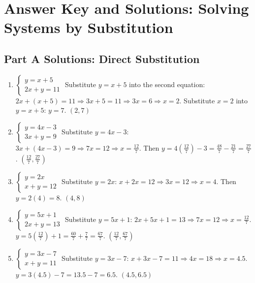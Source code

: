 \documentclass[14pt]{extarticle}
\begin{document}
\newpage


\section*{Answer Key and Solutions: Solving Systems by Substitution}

\subsection*{Part A Solutions: Direct Substitution}
\begin{enumerate}
    \item \(\begin{cases} y = x + 5 \\ 2x + y = 11 \end{cases}\)  
    Substitute \(y = x + 5\) into the second equation:  
    \(2x + (x + 5) = 11 \Rightarrow 3x + 5 = 11 \Rightarrow 3x = 6 \Rightarrow x = 2\).  
    Substitute \(x = 2\) into \(y = x + 5\): \(y = 7\).  
    \(\boxed{(2, 7)}\)

    \item \(\begin{cases} y = 4x - 3 \\ 3x + y = 9 \end{cases}\)  
    Substitute \(y = 4x - 3\): \(3x + (4x - 3) = 9 \Rightarrow 7x = 12 \Rightarrow x = \tfrac{12}{7}\).  
    Then \(y = 4(\tfrac{12}{7}) - 3 = \tfrac{48}{7} - \tfrac{21}{7} = \tfrac{27}{7}\).  
    \(\boxed{(\tfrac{12}{7}, \tfrac{27}{7})}\)

    \item \(\begin{cases} y = 2x \\ x + y = 12 \end{cases}\)  
    Substitute \(y = 2x\): \(x + 2x = 12 \Rightarrow 3x = 12 \Rightarrow x = 4\).  
    Then \(y = 2(4) = 8\).  
    \(\boxed{(4, 8)}\)

    \item \(\begin{cases} y = 5x + 1 \\ 2x + y = 13 \end{cases}\)  
    Substitute \(y = 5x + 1\): \(2x + 5x + 1 = 13 \Rightarrow 7x = 12 \Rightarrow x = \tfrac{12}{7}\).  
    \(y = 5(\tfrac{12}{7}) + 1 = \tfrac{60}{7} + \tfrac{7}{7} = \tfrac{67}{7}\).  
    \(\boxed{(\tfrac{12}{7}, \tfrac{67}{7})}\)

    \item \(\begin{cases} y = 3x - 7 \\ x + y = 11 \end{cases}\)  
    Substitute \(y = 3x - 7\): \(x + 3x - 7 = 11 \Rightarrow 4x = 18 \Rightarrow x = 4.5\).  
    \(y = 3(4.5) - 7 = 13.5 - 7 = 6.5\).  
    \(\boxed{(4.5, 6.5)}\)
\end{enumerate}
\end{document}
